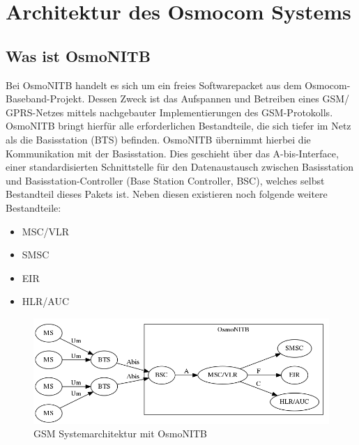 \section{Architektur des Osmocom Systems}


\subsection{Was ist OsmoNITB}
Bei OsmoNITB handelt es sich um ein freies Softwarepacket aus dem Osmocom-Baseband-Projekt. Dessen Zweck ist das Aufspannen und Betreiben eines GSM/ GPRS-Netzes mittels nachgebauter Implementierungen des GSM-Protokolls. OsmoNITB bringt hierfür alle erforderlichen Bestandteile, die sich tiefer im Netz als die Basisstation (BTS) befinden. OsmoNITB übernimmt hierbei die Kommunikation mit der Basisstation. Dies geschieht über das A-bis-Interface, einer standardisierten Schnittstelle für den Datenaustausch zwischen Basisstation und Basisstation-Controller (Base Station Controller, BSC), welches selbst Bestandteil dieses Pakets ist. Neben diesen existieren noch folgende weitere Bestandteile:




\begin{itemize}
\item MSC/VLR\\
\item SMSC\\
\item EIR\\
\item HLR/AUC\\
\end{itemize}



\begin{figure}[h]
    \centering
    \includegraphics[width=15cm]{includes/osmonitb}
    \caption{GSM Systemarchitektur mit OsmoNITB}
	\label{fig:osmonitb}
\end{figure}






